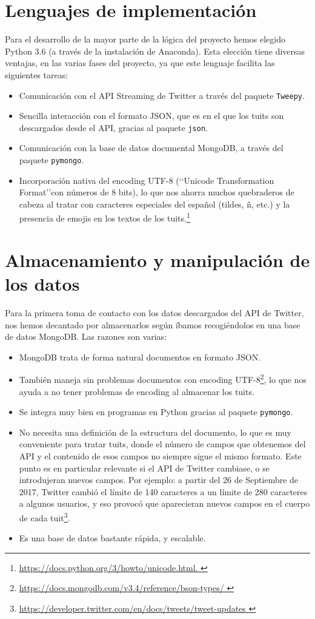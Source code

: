 \section{Lenguajes de implementación}

Para el desarrollo de la mayor parte de la lógica del proyecto hemos elegido Python 3.6 (a través de la
instalación de Anaconda). Esta elección tiene diversas ventajas, en las varias fases del proyecto, ya
que este lenguaje facilita las siguientes tareas:
\begin{itemize}
\item Comunicación con el API Streaming de Twitter a través del paquete {\tt Tweepy}.
\item Sencilla interacción con el formato JSON, que es en el que los tuits son descargados desde el API, gracias al paquete {\tt json}.
\item  Comunicación con la base de datos documental MongoDB, a través del paquete {\tt pymongo}.
\item Incorporación nativa del encoding UTF-8 (\lq\lq Unicode Transformation Format\rq\rq con números de 8 bits), 
lo que nos ahorra muchos quebraderos de cabeza al tratar con caracteres especiales del español (tildes, ñ, etc.)
y la presencia de emojis en los textos de los tuits.\footnote{\url{https://docs.python.org/3/howto/unicode.html. }}
\end{itemize}


\section{Almacenamiento y manipulación de los datos}
Para la primera toma de contacto con los datos descargados del API de Twitter, nos hemos decantado por almacenarlos según íbamos recogiéndolos en una base de datos MongoDB. Las razones son varias:
\begin{itemize}
\item MongoDB trata de forma natural documentos en formato JSON.
\item También maneja sin problemas documentos con encoding UTF-8\footnote{
\url{https://docs.mongodb.com/v3.4/reference/bson-types/ }}, lo que nos ayuda a no tener problemas de encoding al
almacenar los tuits.
\item Se integra muy bien en programas en Python gracias al paquete {\tt pymongo}.
\item No necesita una definición de la estructura del documento, lo que es muy conveniente
para tratar tuits, donde el número de campos que obtenemos del API y el contenido de esos campos no siempre
sigue el mismo formato. Este punto es en particular relevante si el API de Twitter cambiase, o se introdujeran nuevos 
campos. Por ejemplo: a partir del 26 de Septiembre de 2017,  Twitter cambió el límite de 140 caracteres
a un límite de 280 caracteres a algunos usuarios, y eso provocó que aparecieran nuevos campos en el cuerpo de cada
tuit\footnote{\url{https://developer.twitter.com/en/docs/tweets/tweet-updates }}.
\item Es una base de datos bastante rápida, y escalable.
\end{itemize}
